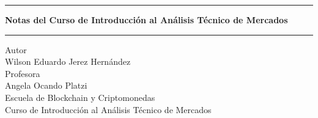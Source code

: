\pagestyle{empty}
\begin{center}
\begin{figure}[h]
\centering


\end{figure}
\Large
\hrule
\vspace{4mm}
\textbf{Notas del Curso de Introducción al Análisis Técnico de Mercados}\\

\vspace{4mm}
\hrule
\large
\vfill
Autor\\

Wilson Eduardo Jerez Hernández \\
\vfill
Profesora\\
Angela Ocando
\vfill
Platzi\\
Escuela de Blockchain y Criptomonedas\\
Curso de Introducción al Análisis Técnico de Mercados\\
\end{center}
\newpage